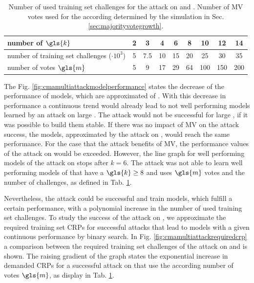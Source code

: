 \begin{table}[ht]
\centering
\begin{tabular}{|l|c|c|c|c|c|c|c|c|}
\hline
number of $\gls{k}$ & 2 & 3 & 4 & 6 & 8 & 10 & 12 & 14\\
\hline
number of training set challenges ($\cdot 10^3$) & 5 & 7.5 & 10 & 15 & 20 & 25 & 30 & 35\\
\hline
number of votes $\gls{m}$ & 5 & 9 & 17 & 29 & 64 & 100 & 150 & 200\\
\hline
\end{tabular}
\caption[Number of votes and challenges used for \acs{CMA-ES} attack]{Number of used training set challenges for the attack on \xpufs and \mxpufs. Number of \ac{MV} votes used for the according \mxpufs determined by the simulation in Sec. \ref{sec:majorityvotegrowth}.}
\label{tab:cmamultinumbervotes}
\end{table}

The Fig. \ref{fig:cmamultiattackmodelperformance} states the decrease of the performance of models, which are approximated of \xpufs.
With this decrease in performance a continuous trend would already lead to not well performing models learned by an attack on large \xpufs.
The attack would not be successful for large \xpufs, if it was possible to build them stable.
If there was no impact of \ac{MV} on the attack success, the models, approximated by the attack on \mxpufs, would reach the same performance.
For the case that the attack benefits of \ac{MV}, the performance values of the attack on \xpufs would be exceeded.
However, the line graph for well performing models of the attack on \mxpufs stops after $k = 6$.
The attack was not able to learn well performing models of \mxpufs that have a $\gls{k} \ge 8$ and uses $\gls{m}$ votes and the number of challenges, as defined in Tab. \ref{tab:cmamultinumbervotes}.

Nevertheless, the attack could be successful and train models, which fulfill a certain performance, with a polynomial increase in the number of used training set challenges.
To study the success of the attack on \mxpufs, we approximate the required training set \acp{CRP} for successful attacks that lead to models with a given continuous performance by binary search.
In Fig. \ref{fig:cmamultiattackrequiredcrp} a comparison between the required training set challenges of the attack on \xpufs and \mxpufs is shown.
The raising gradient of the graph states the exponential increase in demanded \acp{CRP} for a successful attack on \mxpufs that use the according number of votes $\gls{m}$, as display in Tab. \ref{tab:cmamultinumbervotes}.

